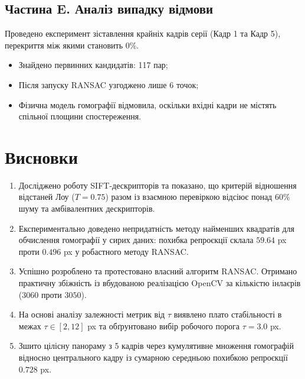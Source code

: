 \documentclass[14pt, a4paper]{article}
\begin{document}
\begin{figure}[h!]
\centering
{}
\end{figure}

\subsection{Частина E. Аналіз випадку відмови}
Проведено експеримент зіставлення крайніх кадрів серії (Кадр 1 та Кадр 5), перекриття між якими становить $0\%$.
\begin{itemize}
    \item Знайдено первинних кандидатів: 117 пар;
    \item Після запуску RANSAC узгоджено лише 6 точок;
    \item Фізична модель гомографії відмовила, оскільки вхідні кадри не містять спільної площини спостереження.
\end{itemize}

\section{Висновки}
\begin{enumerate}[label=\arabic*.]
    \item Досліджено роботу SIFT-дескрипторів та показано, що критерій відношення відстаней Лоу ($T = 0.75$) разом із взаємною перевіркою відсіює понад $60\%$ шуму та амбівалентних дескрипторів.
    \item Експериментально доведено непридатність методу найменших квадратів для обчислення гомографії у сирих даних: похибка репроєкції склала $59.64$ px проти $0.496$ px у робастного методу RANSAC.
    \item Успішно розроблено та протестовано власний алгоритм RANSAC. Отримано практичну збіжність із вбудованою реалізацією OpenCV за кількістю інлаєрів ($3060$ проти $3050$).
    \item На основі аналізу залежності метрик від $\tau$ виявлено плато стабільності в межах $\tau \in [2, 12]$ px та обґрунтовано вибір робочого порога $\tau = 3.0$ px.
    \item Зшито цілісну панораму з 5 кадрів через кумулятивне множення гомографій відносно центрального кадру із сумарною середньою похибкою репроєкції $0.728$ px.
\end{enumerate}
\end{document}
